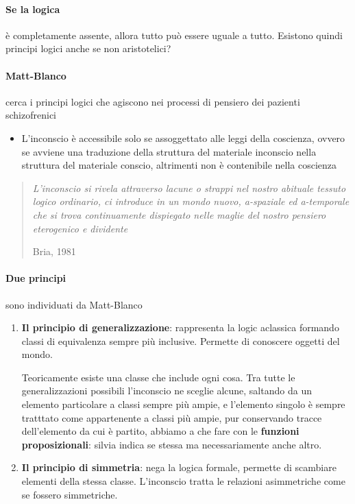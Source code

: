 \documentclass[12pt, a4paper]{article}
\begin{document}
\paragraph{Se la logica}  è completamente assente, allora tutto può essere uguale a tutto. Esistono quindi principi logici anche se non aristotelici?

\paragraph{Matt-Blanco}  cerca i principi logici che agiscono nei processi di pensiero dei pazienti schizofrenici

\begin{itemize}
    \item L'inconscio è accessibile solo se assoggettato alle leggi della coscienza, ovvero se avviene una traduzione della struttura del materiale inconscio nella struttura del materiale conscio, altrimenti non è contenibile nella coscienza
\end{itemize}

\begin{quote}
    \emph{L'inconscio si rivela attraverso lacune o strappi nel nostro abituale tessuto logico ordinario, ci introduce in un mondo nuovo, a-spaziale ed a-temporale che si trova continuamente dispiegato nelle maglie del nostro pensiero eterogenico e dividente}
    \begin{flushright}
        Bria, 1981
    \end{flushright}
\end{quote}

\paragraph{Due principi}  sono individuati da Matt-Blanco

\begin{enumerate}
    \item \textbf{Il principio di generalizzazione}: rappresenta la logic aclassica formando classi di equivalenza sempre più inclusive. Permette di conoscere oggetti del mondo. 

        Teoricamente esiste una classe che include ogni cosa. Tra tutte le generalizzazioni possibili l'inconscio ne sceglie alcune, saltando da un elemento particolare a classi sempre più ampie, e l'elemento singolo è sempre tratttato come appartenente a classi più ampie, pur conservando tracce dell'elemento da cui è partito, abbiamo a che fare con le \textbf{funzioni proposizionali}: silvia indica se stessa ma necessariamente anche altro.
    \item \textbf{Il principio di simmetria}: nega la logica formale, permette di scambiare elementi della stessa classe. L'inconscio tratta le relazioni asimmetriche come se fossero simmetriche.
\end{enumerate}
\end{document}
